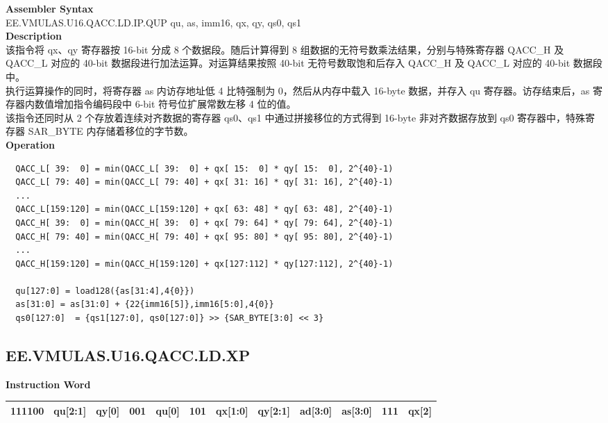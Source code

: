 \textbf{Assembler Syntax} \\
EE.VMULAS.U16.QACC.LD.IP.QUP qu, as, imm16, qx, qy, qs0, qs1 \\
\textbf{Description} \\
该指令将 qx、qy 寄存器按 16-bit 分成 8 个数据段。随后计算得到 8 组数据的无符号数乘法结果，分别与特殊寄存器 QACC\_H 及 QACC\_L 对应的 40-bit 数据段进行加法运算。对运算结果按照 40-bit 无符号数取饱和后存入 QACC\_H 及 QACC\_L 对应的 40-bit 数据段中。\\
执行运算操作的同时，将寄存器 as 内访存地址低 4 比特强制为 0，然后从内存中载入 16-byte 数据，并存入 qu 寄存器。访存结束后，as 寄存器内数值增加指令编码段中 6-bit 符号位扩展常数左移 4 位的值。\\
该指令还同时从 2 个存放着连续对齐数据的寄存器 qs0、qs1 中通过拼接移位的方式得到 16-byte 非对齐数据存放到 qs0 寄存器中，特殊寄存器 SAR\_BYTE 内存储着移位的字节数。\\
\textbf{Operation}
\begin{lstlisting}
  QACC_L[ 39:  0] = min(QACC_L[ 39:  0] + qx[ 15:  0] * qy[ 15:  0], 2^{40}-1)
  QACC_L[ 79: 40] = min(QACC_L[ 79: 40] + qx[ 31: 16] * qy[ 31: 16], 2^{40}-1)
  ...
  QACC_L[159:120] = min(QACC_L[159:120] + qx[ 63: 48] * qy[ 63: 48], 2^{40}-1)
  QACC_H[ 39:  0] = min(QACC_H[ 39:  0] + qx[ 79: 64] * qy[ 79: 64], 2^{40}-1)
  QACC_H[ 79: 40] = min(QACC_H[ 79: 40] + qx[ 95: 80] * qy[ 95: 80], 2^{40}-1)
  ...
  QACC_H[159:120] = min(QACC_H[159:120] + qx[127:112] * qy[127:112], 2^{40}-1)

  qu[127:0] = load128({as[31:4],4{0}})
  as[31:0] = as[31:0] + {22{imm16[5]},imm16[5:0],4{0}}
  qs0[127:0]  = {qs1[127:0], qs0[127:0]} >> {SAR_BYTE[3:0] << 3}
\end{lstlisting}

\clearpage
\subsection{EE.VMULAS.U16.QACC.LD.XP}\label{instruction:EEVMULASU16QACCLDXP}
\setlength\tabcolsep{6pt}
\textbf{Instruction Word} \\
\begin{tabular}{|c|c|c|c|c|c|c|c|c|c|c|c|}
	\hline
	111100 & qu[2:1] & qy[0] & 001 & qu[0] & 101 & qx[1:0] & qy[2:1] & ad[3:0] & as[3:0] & 111 & qx[2] \\
	\hline
\end{tabular}

